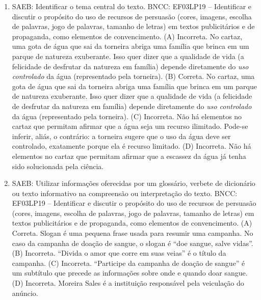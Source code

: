 \begin{enumerate}
\item
SAEB: Identificar o tema central do texto.
BNCC: EF03LP19 -- Identificar e discutir o propósito do uso de recursos de
persuasão (cores, imagens, escolha de palavras, jogo de palavras,
tamanho de letras) em textos publicitários e de propaganda, como
elementos de convencimento.
(A) Incorreta. No cartaz, uma gota de água que sai da torneira abriga uma 
família que brinca em um parque de natureza exuberante. Isso quer dizer 
que a qualidade de vida (a felicidade de desfrutar da natureza em família)
depende diretamente do \textit{uso controlado} da água (representado pela
torneira). 
(B) Correta. No cartaz, uma gota de água que sai da torneira abriga uma 
família que brinca em um parque de natureza exuberante. Isso quer dizer 
que a qualidade de vida (a felicidade de desfrutar da natureza em família)
depende diretamente do \textit{uso controlado} da água (representado pela
torneira). 
(C) Incorreta. Não há elementos no cartaz que permitam afirmar que a água 
seja um recurso ilimitado. Pode-se inferir, aliás, o contrário: a torneira
sugere que o uso da água deve ser controlado, exatamente porque ela é 
recurso limitado. 
(D) Incorreta. Não há elementos no cartaz que permitam afirmar que a 
escassez da água já tenha sido solucionada pela ciência.

\item
SAEB: Utilizar informações oferecidas por um glossário, verbete de
dicionário ou texto informativo na compreensão ou interpretação do
texto.
BNCC: EF03LP19 -- Identificar e discutir o propósito do uso de recursos de
persuasão (cores, imagens, escolha de palavras, jogo de palavras,
tamanho de letras) em textos publicitários e de propaganda, como
elementos de convencimento.
(A) Correta. Slogan é uma pequena frase usada para resumir uma campanha.
No caso da campanha de doação de sangue, o slogan é ``doe sangue, salve
vidas''.
(B) Incorreta. ``Divida o amor que corre em suas veias'' é o título da
campanha.
(C) Incorreta. ``Participe da campanha de doação de sangue'' é um subtítulo
que precede as informações sobre onde e quando doar sangue.
(D) Incorreta. Moreira Sales é a instituição responsável pela veiculação
do anúncio.


\end{enumerate}
